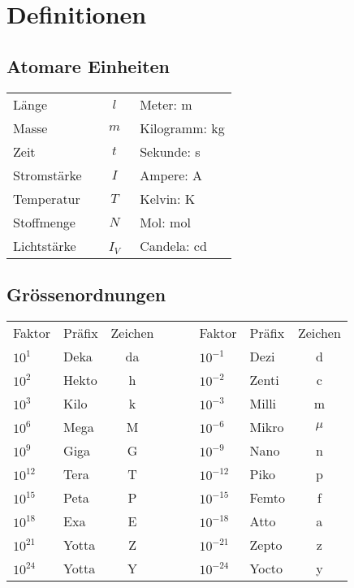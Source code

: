 \section{Definitionen}

\subsection{Atomare Einheiten}
\settowidth{\MyLenA}{Temperatur~~}
\begin{tabular}{lcl}
	Länge 		& $l$ & Meter: \si{\metre} \\
	Masse 		& $m$ & Kilogramm: \si{\kilogram}\\
	Zeit		& $t$ & Sekunde: \si{\second}\\
	Stromstärke 	& $I$ & Ampere: \si{\ampere}\\
	Temperatur	& $T$ & Kelvin: \si{\kelvin}\\
	Stoffmenge	& $N$ & Mol: \si{\mol}\\
	Lichtstärke~~	& ~$I_V$~ & Candela: \si{\candela}\\
\end{tabular}



\subsection{Grössenordnungen}
\settowidth{\MyLenA}{Temperatur~~}
\begin{center}
\begin{tabular}{llccllc}

	Faktor 	& Präfix & Zeichen & ~~~ & Faktor & Präfix & Zeichen \\\cline{1-3}\cline{5-7}
	$10^{1}$ & Deka & da &&	$10^{-1}$ & Dezi & d 		\\
	$10^{2}$ & Hekto & h&&		$10^{-2}$ & Zenti & c 	\\	
	$10^{3}$ & Kilo & k&&  	$10^{-3}$ & Milli & m 		\\
	$10^{6}$ & Mega & M&&  	$10^{-6}$ & Mikro & $\mu$ \\	
	$10^{9}$ & Giga & G&&  	$10^{-9}$ & Nano & n 	\\	
	$10^{12}$ & Tera & T&& 	$10^{-12}$ & Piko & p 	\\	
	$10^{15}$ & Peta & P&& 	$10^{-15}$ & Femto & f 	\\	
	$10^{18}$ & Exa & E&& 	$10^{-18}$ & Atto & a 	\\	
	$10^{21}$ & Yotta & Z&&	$10^{-21}$ & Zepto & z 	\\	
	$10^{24}$ & Yotta & Y&&	$10^{-24}$ & Yocto & y\\ 		
\end{tabular}
\end{center}

